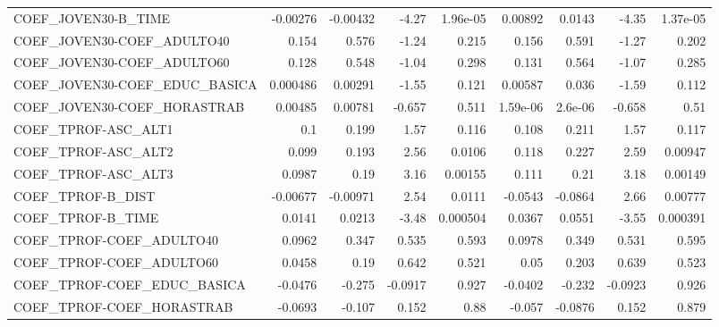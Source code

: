 \begin{tabular}{lrrrrrrrr}
COEF\_JOVEN30-B\_TIME               &    -0.00276 &     -0.00432 &    -4.27 & 1.96e-05 &    0.00892 &      0.0143 &        -4.35 &      1.37e-05 \\
COEF\_JOVEN30-COEF\_ADULTO40        &       0.154 &        0.576 &    -1.24 &    0.215 &      0.156 &       0.591 &        -1.27 &         0.202 \\
COEF\_JOVEN30-COEF\_ADULTO60        &       0.128 &        0.548 &    -1.04 &    0.298 &      0.131 &       0.564 &        -1.07 &         0.285 \\
COEF\_JOVEN30-COEF\_EDUC\_BASICA     &    0.000486 &      0.00291 &    -1.55 &    0.121 &    0.00587 &       0.036 &        -1.59 &         0.112 \\
COEF\_JOVEN30-COEF\_HORASTRAB       &     0.00485 &      0.00781 &   -0.657 &    0.511 &   1.59e-06 &     2.6e-06 &       -0.658 &          0.51 \\
COEF\_TPROF-ASC\_ALT1               &         0.1 &        0.199 &     1.57 &    0.116 &      0.108 &       0.211 &         1.57 &         0.117 \\
COEF\_TPROF-ASC\_ALT2               &       0.099 &        0.193 &     2.56 &   0.0106 &      0.118 &       0.227 &         2.59 &       0.00947 \\
COEF\_TPROF-ASC\_ALT3               &      0.0987 &         0.19 &     3.16 &  0.00155 &      0.111 &        0.21 &         3.18 &       0.00149 \\
COEF\_TPROF-B\_DIST                 &    -0.00677 &     -0.00971 &     2.54 &   0.0111 &    -0.0543 &     -0.0864 &         2.66 &       0.00777 \\
COEF\_TPROF-B\_TIME                 &      0.0141 &       0.0213 &    -3.48 & 0.000504 &     0.0367 &      0.0551 &        -3.55 &      0.000391 \\
COEF\_TPROF-COEF\_ADULTO40          &      0.0962 &        0.347 &    0.535 &    0.593 &     0.0978 &       0.349 &        0.531 &         0.595 \\
COEF\_TPROF-COEF\_ADULTO60          &      0.0458 &         0.19 &    0.642 &    0.521 &       0.05 &       0.203 &        0.639 &         0.523 \\
COEF\_TPROF-COEF\_EDUC\_BASICA       &     -0.0476 &       -0.275 &  -0.0917 &    0.927 &    -0.0402 &      -0.232 &      -0.0923 &         0.926 \\
COEF\_TPROF-COEF\_HORASTRAB         &     -0.0693 &       -0.107 &    0.152 &     0.88 &     -0.057 &     -0.0876 &        0.152 &         0.879 \\

\end{tabular}
